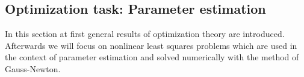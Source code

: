 \documentclass{scrartcl}[12pt, halfparskip]
\numberwithin{equation}{section}
\numberwithin{figure}{section}
\numberwithin{table}{section}
\begin{document}
%
%
%
%
%
%
%
%
%
%
%




\subsection{Optimization task: Parameter estimation}

In this section at first general results of optimization theory are introduced. Afterwards we will focus on nonlinear least squares problems which are used in the context of parameter estimation and solved numerically with the method of Gauss-Newton.
\end{document}
